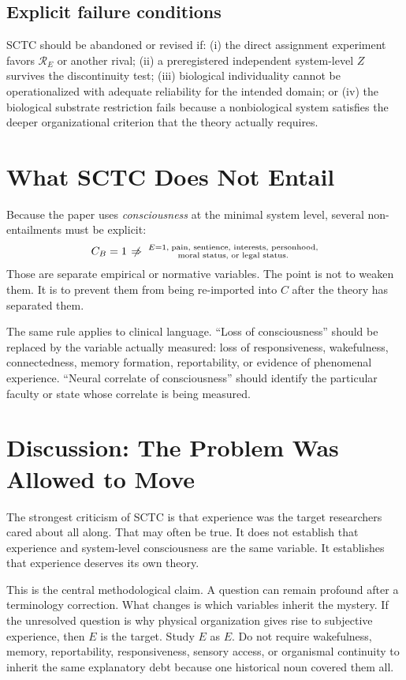 \subsection{Explicit failure conditions}
SCTC should be abandoned or revised if: (i) the direct assignment experiment favors $\mathcal R_E$ or another rival; (ii) a preregistered independent system-level $Z$ survives the discontinuity test; (iii) biological individuality cannot be operationalized with adequate reliability for the intended domain; or (iv) the biological substrate restriction fails because a nonbiological system satisfies the deeper organizational criterion that the theory actually requires.

\section{What SCTC Does Not Entail}
Because the paper uses \emph{consciousness} at the minimal system level, several non-entailments must be explicit:
\begin{equation}
C_B=1\;\not\!\Rightarrow\;\substack{E=1,\;\text{pain, sentience, interests, personhood,}\\
\text{moral status, or legal status}.}
\end{equation}
Those are separate empirical or normative variables. The point is not to weaken them. It is to prevent them from being re-imported into $C$ after the theory has separated them.

The same rule applies to clinical language. ``Loss of consciousness'' should be replaced by the variable actually measured: loss of responsiveness, wakefulness, connectedness, memory formation, reportability, or evidence of phenomenal experience. ``Neural correlate of consciousness'' should identify the particular faculty or state whose correlate is being measured.

\section{Discussion: The Problem Was Allowed to Move}
The strongest criticism of SCTC is that experience was the target researchers cared about all along. That may often be true. It does not establish that experience and system-level consciousness are the same variable. It establishes that experience deserves its own theory.

This is the central methodological claim. A question can remain profound after a terminology correction. What changes is which variables inherit the mystery. If the unresolved question is why physical organization gives rise to subjective experience, then $E$ is the target. Study $E$ as $E$. Do not require wakefulness, memory, reportability, responsiveness, sensory access, or organismal continuity to inherit the same explanatory debt because one historical noun covered them all.

